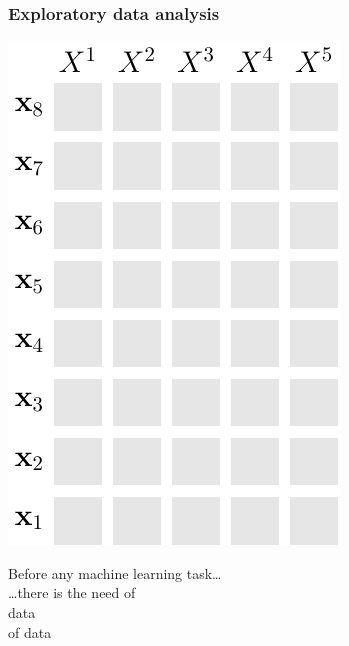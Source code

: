 \documentclass[xcolor={usenames,dvipsnames,svgnames}, compress, aspectratio=169, 11pt]{beamer}
\begin{document}
{
  \begin{frame}
    \titlepage
  \end{frame}
}



  



\begin{frame}[t, htt=bgrey2]
  \frametitle{Exploratory data analysis}
  \large
  \begin{minipage}[t]{0.4\linewidth}\vspace{15pt}
    \includegraphics[width=.5\linewidth]{figures/abda-grid-empty}
  \end{minipage}\hfill\begin{minipage}[t]{0.55\linewidth}
    \vspace{20pt}
    Before any machine learning task\ldots\\[20pt]
    \ldots there is the need of \\[5pt]
    \hspace{5pt} data\\[-2pt]
    \hspace{5pt} of data\\
  \end{minipage}  
\end{frame}
\end{document}
